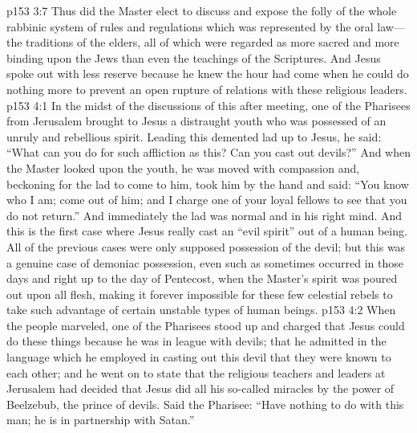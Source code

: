 \vs p153 3:7 Thus did the Master elect to discuss and expose the folly of the whole rabbinic system of rules and regulations which was represented by the oral law---the traditions of the elders, all of which were regarded as more sacred and more binding upon the Jews than even the teachings of the Scriptures. And Jesus spoke out with less reserve because he knew the hour had come when he could do nothing more to prevent an open rupture of relations with these religious leaders.
\vs p153 4:1 In the midst of the discussions of this after meeting, one of the Pharisees from Jerusalem brought to Jesus a distraught youth who was possessed of an unruly and rebellious spirit. Leading this demented lad up to Jesus, he said: “What can you do for such affliction as this? Can you cast out devils?” And when the Master looked upon the youth, he was moved with compassion and, beckoning for the lad to come to him, took him by the hand and said: \textcolor{ubdarkred}{“You know who I am; come out of him; and I charge one of your loyal fellows to see that you do not return.”} And immediately the lad was normal and in his right mind. And this is the first case where Jesus really cast an “evil spirit” out of a human being. All of the previous cases were only supposed possession of the devil; but this was a genuine case of demoniac possession, even such as sometimes occurred in those days and right up to the day of Pentecost, when the Master’s spirit was poured out upon all flesh, making it forever impossible for these few celestial rebels to take such advantage of certain unstable types of human beings.\plusone
\vs p153 4:2 When the people marveled, one of the Pharisees stood up and charged that Jesus could do these things because he was in league with devils; that he admitted in the language which he employed in casting out this devil that they were known to each other; and he went on to state that the religious teachers and leaders at Jerusalem had decided that Jesus did all his so\hyp{}called miracles by the power of Beelzebub, the prince of devils. Said the Pharisee: “Have nothing to do with this man; he is in partnership with Satan.”

